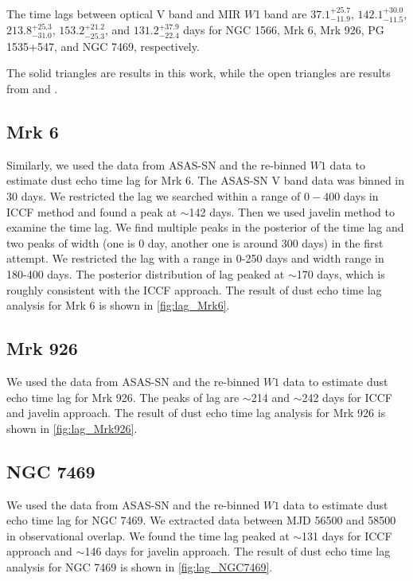 
The time lags between optical V band and MIR $W$1 band are $37.1^{+25.7}_{-11.9}$, $142.1^{+30.0}_{-11.5}$, $213.8^{+25.3}_{-31.0}$, $153.2^{+21.2}_{-25.3}$, and $131.2^{+37.9}_{-22.4}$ days for NGC 1566, Mrk 6, Mrk 926, PG 1535+547, and NGC 7469, respectively.

The solid triangles are results in this work, while the open triangles are results from \citet{2014ApJ...788..159K} and \citet{2019ApJ...886...33L}.


\subsection{Mrk 6}
Similarly, we used the data from ASAS-SN and the re-binned $W1$ data to estimate dust echo time lag for Mrk 6. The ASAS-SN V band data was binned in 30 days. We restricted the lag we searched within a range of $0-400$ days in ICCF method and found a peak at $\sim$142 days. Then we used {\sc javelin} method to examine the time lag. We find multiple peaks in the posterior of the time lag and two peaks of width (one is 0 day, another one is around 300 days) in the first attempt. We restricted the lag with a range in 0-250 days and width range in 180-400 days. The posterior distribution of lag peaked at $\sim$170 days, which is roughly consistent with the ICCF approach. The result of dust echo time lag analysis for Mrk 6 is shown in \autoref{fig:lag_Mrk6}. 




\subsection{Mrk 926}
We used the data from ASAS-SN and the re-binned $W1$ data to estimate dust echo time lag for Mrk 926. The peaks of lag are $\sim$214 and $\sim$242 days for ICCF and {\sc javelin} approach. The result of dust echo time lag analysis for Mrk 926 is shown in \autoref{fig:lag_Mrk926}. 


\subsection{NGC 7469}
We used the data from ASAS-SN and the re-binned $W1$ data to estimate dust echo time lag for NGC 7469. We extracted data between MJD 56500 and 58500 in observational overlap. We found the time lag peaked at $\sim$131 days for ICCF approach and $\sim$146 days for {\sc javelin} approach. The result of dust echo time lag analysis for NGC 7469 is shown in \autoref{fig:lag_NGC7469}.


